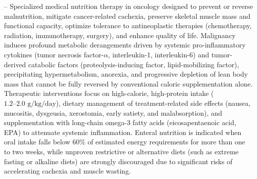 -- Specialized medical nutrition therapy in oncology designed to prevent or reverse malnutrition, mitigate cancer-related cachexia, preserve skeletal muscle mass and functional capacity, optimize tolerance to antineoplastic therapies (chemotherapy, radiation, immunotherapy, surgery), and enhance quality of life. Malignancy induces profound metabolic derangements driven by systemic pro-inflammatory cytokines (tumor necrosis factor-$\alpha$, interleukin-1, interleukin-6) and tumor-derived catabolic factors (proteolysis-inducing factor, lipid-mobilizing factor), precipitating hypermetabolism, anorexia, and progressive depletion of lean body mass that cannot be fully reversed by conventional caloric supplementation alone. Therapeutic interventions focus on high-calorie, high-protein intake ($1.2\text{--}2.0\text{ g/kg/day}$), dietary management of treatment-related side effects (nausea, mucositis, dysgeusia, xerostomia, early satiety, and malabsorption), and supplementation with long-chain omega-3 fatty acids (eicosapentaenoic acid, EPA) to attenuate systemic inflammation. Enteral nutrition is indicated when oral intake falls below $60\%$ of estimated energy requirements for more than one to two weeks, while unproven restrictive or alternative diets (such as extreme fasting or alkaline diets) are strongly discouraged due to significant risks of accelerating cachexia and muscle wasting.

